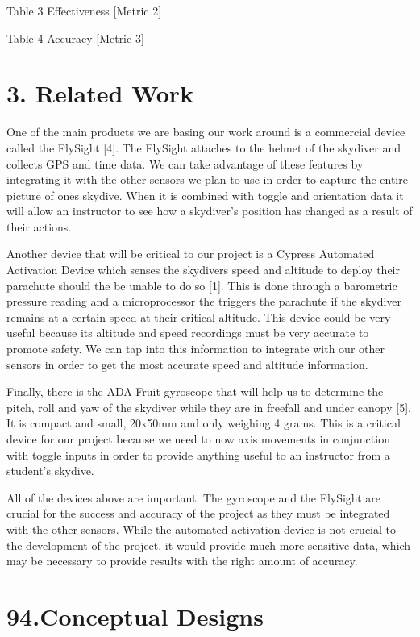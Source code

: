 \documentclass[10pt]{article}
\begin{document}
Table 3 Effectiveness [Metric 2]

Table 4 Accuracy [Metric 3]

\section{3. Related Work}
One of the main products we are basing our work around is a commercial device called the FlySight [4]. The FlySight attaches to the helmet of the skydiver and collects GPS and time data. We can take advantage of these features by integrating it with the other sensors we plan to use in order to capture the entire picture of ones skydive. When it is combined with toggle and orientation data it will allow an instructor to see how a skydiver’s position has changed as a result of their actions.

Another device that will be critical to our project is a Cypress Automated Activation Device which senses the skydivers speed and altitude to deploy their parachute should the be unable to do so [1]. This is done through a barometric pressure reading and a microprocessor the triggers the parachute if the skydiver remains at a certain speed at their critical altitude. This device could be very useful because its altitude and speed recordings must be very accurate to promote safety. We can tap into this information to integrate with our other sensors in order to get the most accurate speed and altitude information.

Finally, there is the ADA-Fruit gyroscope that will help us to determine the pitch, roll and yaw of the skydiver while they are in freefall and under canopy [5]. It is compact and small, 20x50mm and only weighing 4 grams. This is a critical device for our project because we need to now axis movements in conjunction with toggle inputs in order to provide anything useful to an instructor from a student’s skydive.

All of the devices above are important. The gyroscope and the FlySight are crucial for the success and accuracy of the project as they must be integrated with the other sensors. While the automated activation device is not crucial to the development of the project, it would provide much more sensitive data, which may be necessary to provide results with the right amount of accuracy.



\section{94.Conceptual Designs}
\end{document}
